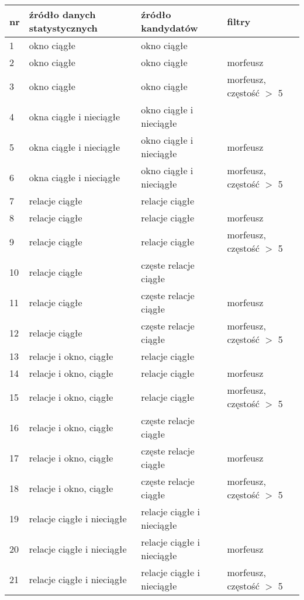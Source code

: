 \begin{table}[h!]
\centering
\footnotesize\setlength{\tabcolsep}{2.5pt}
\begin{tabular}{ l || l | l | l }
	\toprule
	\textbf{nr} 	& \textbf{źródło danych statystycznych}			& \textbf{źródło kandydatów}		& \textbf{filtry}					\\
	\midrule
	1	& okno ciągłe 							& okno ciągłe			&							\\
	2	& okno ciągłe 							& okno ciągłe			& morfeusz					\\
	3	& okno ciągłe 							& okno ciągłe			& morfeusz, częstość $>$ 5	\\
	4	& okna ciągłe i nieciągłe 				& okno ciągłe i nieciągłe			&							\\
	5	& okna ciągłe i nieciągłe 				& okno ciągłe i nieciągłe			& morfeusz					\\
	6	& okna ciągłe i nieciągłe 				& okno ciągłe i nieciągłe			& morfeusz, częstość $>$ 5	\\
	7	& relacje ciągłe						& relacje ciągłe		&							\\
	8	& relacje ciągłe						& relacje ciągłe		& morfeusz					\\
	9	& relacje ciągłe						& relacje ciągłe		& morfeusz, częstość $>$ 5	\\
	10	& relacje ciągłe						& częste relacje ciągłe &							\\
	11	& relacje ciągłe						& częste relacje ciągłe & morfeusz					\\
	12	& relacje ciągłe						& częste relacje ciągłe & morfeusz, częstość $>$ 5	\\
	13	& relacje i okno, ciągłe				& relacje ciągłe		& 							\\
	14	& relacje i okno, ciągłe				& relacje ciągłe 		& morfeusz 					\\
	15	& relacje i okno, ciągłe				& relacje ciągłe		& morfeusz, częstość $>$ 5	\\
	16	& relacje i okno, ciągłe				& częste relacje ciągłe	&							\\
	17	& relacje i okno, ciągłe	 			& częste relacje ciągłe	& morfeusz					\\
	18	& relacje i okno, ciągłe				& częste relacje ciągłe	& morfeusz, częstość $>$ 5	\\
	19	& relacje ciągłe i nieciągłe			& relacje ciągłe i nieciągłe 		& 							\\
	20	& relacje ciągłe i nieciągłe			& relacje ciągłe i nieciągłe		& morfeusz					\\
	21	& relacje ciągłe i nieciągłe			& relacje ciągłe i nieciągłe		& morfeusz, częstość $>$ 5	\\

\end{tabular}
\end{table}
